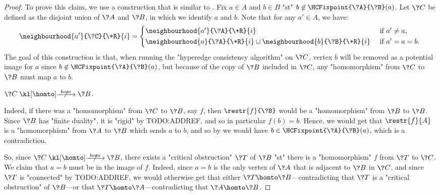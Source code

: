 \begin{proof}
	To prove this claim, we use a construction that is similar to .
	Fix $a\in A$ and $b\in B$ "st" $b \not\in \HCFixpoint{\?A}{\?B}(a)$.
	Let $\?C$ be defined as the disjoint union of $\?A$ and $\?B$,
	in which we identify $a$ and $b$.
	Note that for any $a' \in A$, we have:
	\[
		\neighbourhood{a'}{\?C}{\+R}{i} =
		\begin{cases*}
			\neighbourhood{a'}{\?A}{\+R}{i} & \text{ if $a' \neq a$,}\\
			\neighbourhood{a}{\?A}{\+R}{i} \cup \neighbourhood{b}{\?B}{\+R}{i}  & \text{ if $a' = a = b$.}
		\end{cases*}	
	\]
	The goal of this construction
	is that, when running the "hyperedge consistency algorithm" on $\?C$,
	vertex $b$ will be removed as a potential image for $a$ since $b \not\in \HCFixpoint{\?A}{\?B}(a)$, but because of the copy of $\?B$ included in $\?C$, any "homomorphism" from $\?C$ to $\?B$ must map $a$ to $b$.

	\begin{claim}
		\AP\label{claim:hyperedge-consistency-uniform-convergence-hom-union}
		$\?C \nothomto \?B$.
	\end{claim} 

	Indeed, if there was a "homomorphism" from $\?C$ to $\?B$, say $f$, then
	$\restr{f}{\?B}$ would be a "homomorphism" from $\?B$ to $\?B$.
	Since $\?B$ has "finite duality", it is "rigid" by TODO:ADDREF, and
	so in particular $f(b) = b$.
	Hence, we would get that $\restr{f}{A}$ is a "homomorphism" from $\?A$ to $\?B$
	which sends $a$ to $b$, and so by 
	we would have $b \in \HCFixpoint{\?A}{\?B}(a)$, which is a contradiction.

	So, since $\?C \nothomto \?B$, there exists a "critical obstruction" $\?T$ of $\?B$
	"st" there is a "homomorphism" $f$ from $\?T$ to $\?C$. 
	We claim that $a=b$ must be in the image of $f$. Indeed, since $a=b$ is the only vertex
	of $\?A$ that is adjacent to $\?B$ in $\?C$, and since $\?T$ is "connected" by TODO:ADDREF,
	we would otherwise get that either $\?T \homto \?B$---contradicting that $\?T$ is a "critical obstruction" of $\?B$---or that $\?T \homto \?A$---contradicting that $\?A \homto \?B$.
	

\end{proof}
